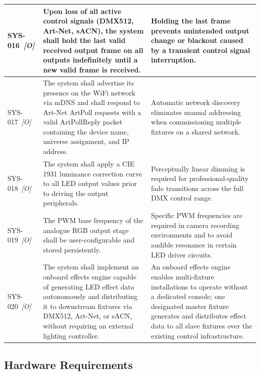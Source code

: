 \begin{longtable}{|p{1.8cm}|p{\dimexpr(\linewidth-1.8cm-6\tabcolsep-4\arrayrulewidth)/2\relax}|p{\dimexpr(\linewidth-1.8cm-6\tabcolsep-4\arrayrulewidth)/2\relax}|}
    \label{req:sys016}SYS-016~\textit{[O]} &
      Upon loss of all active control signals (\ac{DMX}512, Art-Net, \ac{sACN}), the system shall hold the last valid received output frame on all outputs indefinitely until a new valid frame is received. &
      Holding the last frame prevents unintended output change or blackout caused by a transient control signal interruption. \\ \hline
    \label{req:sys017}SYS-017~\textit{[O]} &
      The system shall advertise its presence on the \ac{WiFi} network via \ac{mDNS} and shall respond to Art-Net ArtPoll requests with a valid ArtPollReply packet containing the device name, universe assignment, and \ac{IP} address. &
      Automatic network discovery eliminates manual addressing when commissioning multiple fixtures on a shared network. \\ \hline
    \label{req:sys018}SYS-018~\textit{[O]} &
      The system shall apply a \ac{CIE} 1931 luminance correction curve to all \ac{LED} output values prior to driving the output peripherals. &
      Perceptually linear dimming is required for professional-quality fade transitions across the full \ac{DMX} control range. \\ \hline
    \label{req:sys019}SYS-019~\textit{[O]} &
      The \ac{PWM} base frequency of the analogue \ac{RGB} output stage shall be user-configurable and stored persistently. &
      Specific \ac{PWM} frequencies are required in camera recording environments and to avoid audible resonance in certain \ac{LED} driver circuits. \\ \hline
    \label{req:sys020}SYS-020~\textit{[O]} &
      The system shall implement an onboard effects engine capable of generating \ac{LED} effect data autonomously and distributing it to downstream fixtures via \ac{DMX}512, Art-Net, or \ac{sACN}, without requiring an external lighting controller. &
      An onboard effects engine enables multi-fixture installations to operate without a dedicated console; one designated master fixture generates and distributes effect data to all slave fixtures over the existing control infrastructure. \\ \hline
\end{longtable}

\subsection{Hardware Requirements}
\label{sec:req_hardware}

